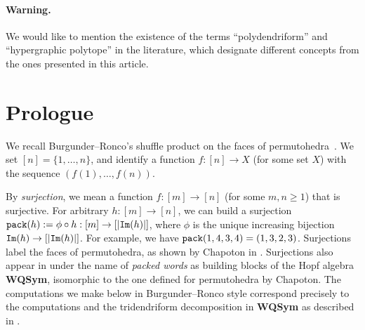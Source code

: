 \documentclass[11pt]{article}
\theoremstyle{definition}
\numberwithin{equation}{section}
\numberwithin{equation}{section}
\newcommand{\set}[1]{\{#1\}}
\begin{document}
\paragraph{\bf Warning.}
We  would like to mention the existence of the terms ``polydendriform'' \cite{Samuele} and ``hypergraphic polytope'' \cite{AguiarArdila} 
in the literature, which designate different concepts from the ones presented in this article.


\section{Prologue} \label{Prologue-section}

We recall Burgunder--Ronco's shuffle product on the faces of permutohedra~\cite{BR}.
We set $[n]=\set{1,\ldots,n}$, and identify a function $f:[n]\rightarrow X$ (for some set $X$) with the sequence $(f(1),\ldots,f(n))$.

By {\em surjection}, we mean a function $f:[m]\rightarrow[n]$ (for some $m,n\geq 1$) that is surjective.  
For arbitrary $h:[m]\rightarrow[n]$, we can build a surjection 
${\tt pack}(h):=\phi\circ h: [m]\rightarrow [|{\tt Im}(h)|]$,
where $\phi$ is the unique increasing bijection ${\tt Im}(h)\rightarrow  [|{\tt Im}(h)|]$.
For example, we have
 ${\tt pack}(1,4,3,4)=(1,3,2,3)$. Surjections label the faces of permutohedra, as shown by Chapoton in \cite{Ch00}. Surjections also appear in  \cite{HNT} under the name of {\em packed words}   as building blocks of the Hopf algebra {\bf WQSym}, isomorphic to the one defined for permutohedra by Chapoton.  The computations we make below in Burgunder--Ronco style correspond precisely to the computations and the tridendriform decomposition in {\bf WQSym} as described in \cite{HNT}.
 
\end{document}

